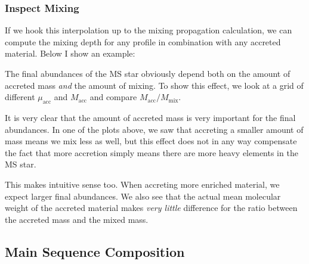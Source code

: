 \documentclass[a4paper,10pt]{article}
\begin{document}
\nextpage
\subsubsection{Inspect Mixing}
If we hook this interpolation up to the mixing propagation calculation, we can
compute the mixing depth for any profile in combination with any accreted material.
Below I show an example:

\begin{figure}[ht]
    \centering
\end{figure}

The final abundances of the MS star obviously depend both on the amount of accreted mass \emph{and} the amount of mixing.
To show this effect, we look at a grid of different \(\mu_\text{acc}\) and \(M_\text{acc}\) and compare \(M_\text{acc} / M_\text{mix}\).

\begin{figure}[ht]
    \centering
\end{figure}

It is very clear that the amount of accreted mass is very important for the final abundances. In one of the plots above, we saw that accreting a smaller amount of mass
means we mix less as well, but this effect does not in any way compensate the fact that more accretion simply means there are more heavy elements in the MS star.

This makes intuitive sense too. When accreting more enriched material, we expect larger final abundances. We also see that the actual mean molecular weight of the
accreted material makes \emph{very little} difference for the ratio between the accreted mass and the mixed mass.

\subsection{Main Sequence Composition}
\end{document}
